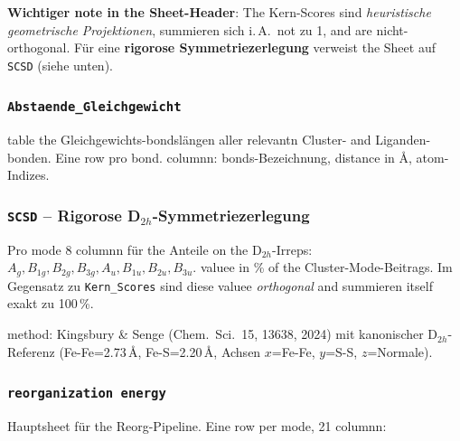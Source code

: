 \documentclass[11pt,a4paper,twoside]{article}
\providecommand{\angstrom}{\text{\AA}}    %
\theoremstyle{remark}
\begin{document}
\textbf{Wichtiger note in the Sheet-Header}: The Kern-Scores sind
\emph{heuristische geometrische Projektionen}, summieren sich
i.\,A.\ not zu 1, and are nicht-orthogonal. F\"ur eine
\textbf{rigorose Symmetriezerlegung} verweist the Sheet auf
\texttt{SCSD} (siehe unten).

\subsubsection*{\texttt{Abstaende\_Gleichgewicht}}

table the Gleichgewichts-bondsl\"angen aller relevantn
Cluster- and Liganden-bonden. Eine row pro bond. columnn:
bonds-Bezeichnung, distance in $\angstrom$, atom-Indizes.

\subsubsection*{\texttt{SCSD} -- Rigorose D$_{2h}$-Symmetriezerlegung}

Pro mode 8 columnn f\"ur the Anteile on the D$_{2h}$-Irreps:
$A_g, B_{1g}, B_{2g}, B_{3g}, A_u, B_{1u}, B_{2u}, B_{3u}$. valuee
in \% of the Cluster-Mode-Beitrags. Im Gegensatz zu \texttt{Kern\_Scores}
sind diese valuee \emph{orthogonal} and summieren itself exakt zu 100\,\%.

method: Kingsbury \& Senge (Chem.\ Sci.\ 15, 13638, 2024) mit
kanonischer D$_{2h}$-Referenz (Fe-Fe=2.73\,$\angstrom$,
Fe-S=2.20\,$\angstrom$, Achsen $x$=Fe-Fe, $y$=S-S, $z$=Normale).

\subsubsection*{\texttt{reorganization energy}}
\label{app:sheet-reorg}

Hauptsheet f\"ur the Reorg-Pipeline. Eine row per mode, 21 columnn:
\end{document}
